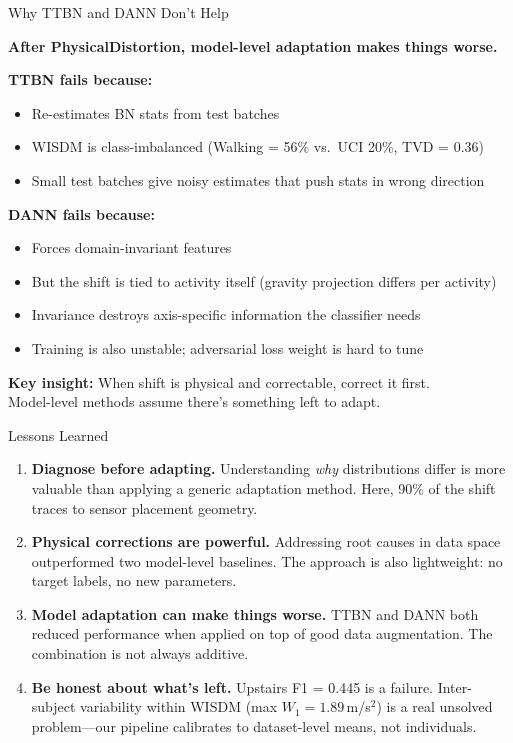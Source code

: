 \documentclass{beamer}
\begin{document}
\begin{frame}[shrink=12]{Why TTBN and DANN Don't Help}

\textbf{After PhysicalDistortion, model-level adaptation makes things worse.}

\medskip
\textbf{TTBN fails because:}
\begin{itemize}
    \item Re-estimates BN stats from test batches
    \item WISDM is class-imbalanced (Walking = 56\% vs.\ UCI 20\%, TVD = 0.36)
    \item Small test batches give noisy estimates that push stats in wrong direction
\end{itemize}

\smallskip
\textbf{DANN fails because:}
\begin{itemize}
    \item Forces domain-invariant features
    \item But the shift is tied to activity itself (gravity projection differs per activity)
    \item Invariance destroys axis-specific information the classifier needs
    \item Training is also unstable; adversarial loss weight is hard to tune
\end{itemize}

\smallskip
\textbf{Key insight:} When shift is physical and correctable, correct it first. \\
Model-level methods assume there's something left to adapt.

\end{frame}

\begin{frame}[shrink=5]{Lessons Learned}

\begin{enumerate}
    \item \textbf{Diagnose before adapting.} Understanding \emph{why} distributions differ is more valuable than applying a generic adaptation method. Here, 90\% of the shift traces to sensor placement geometry.

    \medskip
    \item \textbf{Physical corrections are powerful.} Addressing root causes in data space outperformed two model-level baselines. The approach is also lightweight: no target labels, no new parameters.

    \medskip
    \item \textbf{Model adaptation can make things worse.} TTBN and DANN both reduced performance when applied on top of good data augmentation. The combination is not always additive.

    \medskip
    \item \textbf{Be honest about what's left.} Upstairs F1 = 0.445 is a failure. Inter-subject variability within WISDM (max $W_1 = 1.89$\,m/s$^2$) is a real unsolved problem—our pipeline calibrates to dataset-level means, not individuals.
\end{enumerate}

\end{frame}
\end{document}
